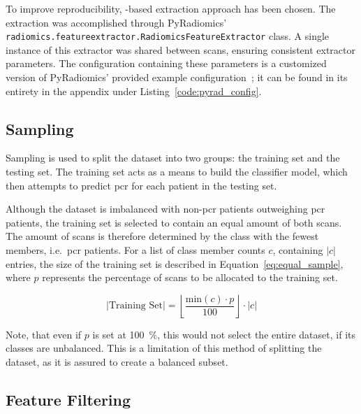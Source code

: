 To improve reproducibility, -based extraction approach has been 
chosen. The extraction was accomplished through PyRadiomics' 
\texttt{radiomics.featureextractor.RadiomicsFeatureExtractor} class. A single 
instance of this extractor was shared between scans, ensuring consistent 
extractor parameters. The configuration containing these parameters is a 
customized version of PyRadiomics' provided example configuration~\cite{py_rad_docs};
it can be found in its entirety in the appendix under Listing~\ref{code:pyrad_config}.

\subsection{Sampling}\label{sec:sampling}

Sampling is used to split the dataset into two groups: the training set
and the testing set. The training set acts as a means to build the 
classifier model, which then attempts to predict \ac{pcr} for each patient in 
the testing set. 


Although the dataset is imbalanced with non-\acs{pcr} patients outweighing 
\acs{pcr} patients, the training set is selected to contain an equal amount of 
both scans. The amount of scans is therefore determined by the class with the fewest
members, i.e.~\acs{pcr} patients. For a list of class member counts $c$, 
containing $\left\lvert c \right\rvert $ entries, the size of the training set
is described in Equation~\ref{eq:equal_sample}, where $p$ represents the 
percentage of scans to be allocated to the training set. 

\begin{equation} \label{eq:equal_sample}
    \left\lvert \text{Training Set} \right\rvert  = \left\lfloor \frac{\text{min}(c) \cdot p}{100} \right\rfloor \cdot \left\lvert c \right\rvert 
\end{equation}

Note, that even
if $p$ is set at \SI{100}{\percent}, this would not select the entire dataset, if its classes
are unbalanced. This is a limitation of this method of splitting the dataset, as
it is assured to create a balanced subset.


\subsection{Feature Filtering}\label{sec:feature_filtering}


